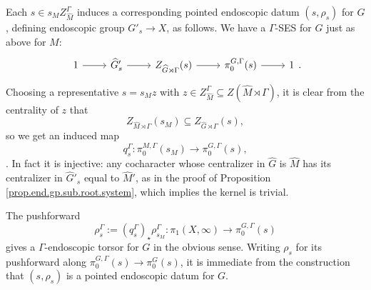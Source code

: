 \documentclass[openany]{amsbook}
\theoremstyle{definition}
\theoremstyle{remark}
\numberwithin{equation}{section}
\renewcommand{\-}{\operatorname{-}}
\begin{document}
Each $s \in s_M Z_{\widehat{M}}^{\Gamma}$ induces a corresponding pointed endoscopic datum $(s, \rho_s)$ for $G$, defining endoscopic group $G'_s \to X$, as follows. We have a $\Gamma$-SES for $G$ just as above for $M$:
\[
\begin{tikzcd}[ampersand replacement=\&]
        1 \ar[r] \& \widehat{G}'_s \ar[r] \& Z_{\widehat{G} \rtimes \Gamma}(s) \ar[r] \& \pi_0^{G,\Gamma}(s) \ar[r] \& 1
\end{tikzcd}.
\]
Choosing a representative $s = s_M z$ with $z \in Z_{\widehat{M}}^\Gamma \subseteq Z(\widehat{M} \rtimes \Gamma)$, it is clear from the centrality of $z$ that
$$
    Z_{\widehat{M} \rtimes \Gamma}(s_M) \subseteq Z_{\widehat{G} \rtimes \Gamma}(s),
$$
so we get an induced map \begin{equation} q_s^{\Gamma} : \pi_0^{M,\Gamma}(s_M) \to \pi_0^{G,\Gamma}(s),\label{eqn.endo.map.pi0}\end{equation}. In fact it is injective: any cocharacter whose centralizer in $\widehat{G}$ is $\widehat{M}$ has its centralizer in $\widehat{G}'_s$ equal to $\widehat{M}'$, as in the proof of Proposition \ref{prop.end.gp.sub.root.system}, which implies the kernel is trivial. 

The pushforward
$$
    \rho_s^{\Gamma} := (q_s^\Gamma)_\star \rho_{s_M}^{\Gamma} : \pi_1(X, \infty) \to \pi_0^{G,\Gamma}(s) 
$$
gives a $\Gamma$-endoscopic torsor for $G$ in the obvious sense. Writing $\rho_s$ for its pushforward along $\pi_0^{G,\Gamma}(s) \to \pi_0^{G}(s)$, it is immediate from the construction that $(s, \rho_s)$ is a pointed endoscopic datum for $G$. 
\end{document}
